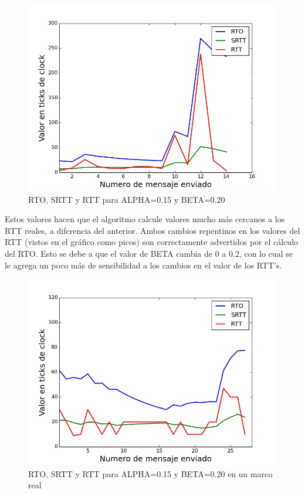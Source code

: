\begin{figure}[H]
  \begin{center}
      \includegraphics[scale=0.32]{imagenes/ALPHA_015_BETA_020.jpg}
      \caption{RTO, SRTT y RTT para ALPHA=0.15 y BETA=0.20}
  \end{center}
\end{figure}

Estos valores hacen que el algoritmo calcule valores mucho más cercanos a los RTT reales, a diferencia
del anterior. Ambos cambios repentinos en los valores del RTT (vistos en el gráfico como picos) son
correctamente advertidos por el cálculo del RTO. Esto se debe a que el valor de BETA cambia de 0 a
0.2, con lo cual se le agrega un poco más de sensibilidad a los cambios en el valor de los RTT's.

\begin{figure}[H]
  \begin{center}
      \includegraphics[scale=0.32]{imagenes/OPTIMOS_MARCO_REAL.jpg}
      \caption{RTO, SRTT y RTT para ALPHA=0.15 y BETA=0.20 en un marco real}
  \end{center}
\end{figure}

